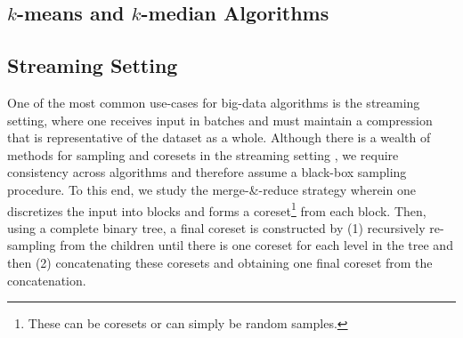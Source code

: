 \subsection{$k$-means and $k$-median Algorithms}

\subsection{Streaming Setting}
\label{ssec:streaming_prelim}

One of the most common use-cases for big-data algorithms is the streaming setting, where one receives input in batches and must maintain a compression that is
representative of the dataset as a whole. Although there is a wealth of methods for sampling and coresets in the streaming setting , we
require consistency across algorithms and therefore assume a black-box sampling procedure. To this end, we study the merge-\&-reduce strategy
 wherein one discretizes the input into blocks and forms a coreset\footnote{These can be coresets or can simply be random samples.} from each
block. Then, using a complete binary tree, a final coreset is constructed by (1) recursively re-sampling from the children until there is one coreset for each
level in the tree and then (2) concatenating these coresets and obtaining one final coreset from the concatenation. 
